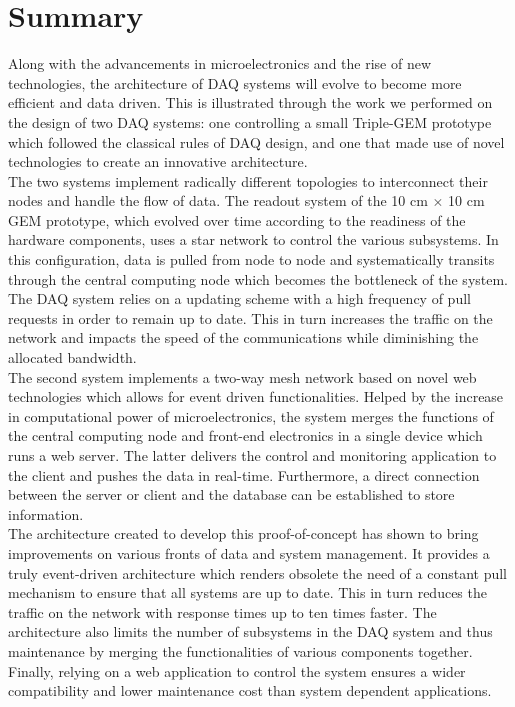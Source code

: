 \chapter{Summary}
\label{chap:III-3-summary}

  Along with the advancements in microelectronics and the rise of new technologies, the architecture of DAQ systems will evolve to become more efficient and data driven. This is illustrated through the work we performed on the design of two DAQ systems: one controlling a small Triple-GEM prototype which followed the classical rules of DAQ design, and one that made use of novel technologies to create an innovative architecture. \\

  The two systems implement radically different topologies to interconnect their nodes and handle the flow of data. The readout system of the 10 cm $ \times $ 10 cm GEM prototype, which evolved over time according to the readiness of the hardware components, uses a star network to control the various subsystems. In this configuration, data is pulled from node to node and systematically transits through the central computing node which becomes the bottleneck of the system. The DAQ system relies on a updating scheme with a high frequency of pull requests in order to remain up to date. This in turn increases the traffic on the network and impacts the speed of the communications while diminishing the allocated bandwidth. \\

  The second system implements a two-way mesh network based on novel web technologies which allows for event driven functionalities. Helped by the increase in computational power of microelectronics, the system merges the functions of the central computing node and front-end electronics in a single device which runs a web server. The latter delivers the control and monitoring application to the client and pushes the data in real-time. Furthermore, a direct connection between the server or client and the database can be established to store information. \\

  The architecture created to develop this proof-of-concept has shown to bring improvements on various fronts of data and system management. It provides a truly event-driven architecture which renders obsolete the need of a constant pull mechanism to ensure that all systems are up to date. This in turn reduces the traffic on the network with response times up to ten times faster. The architecture also limits the number of subsystems in the DAQ system and thus maintenance by merging the functionalities of various components together. Finally, relying on a web application to control the system ensures a wider compatibility and lower maintenance cost than system dependent applications.
